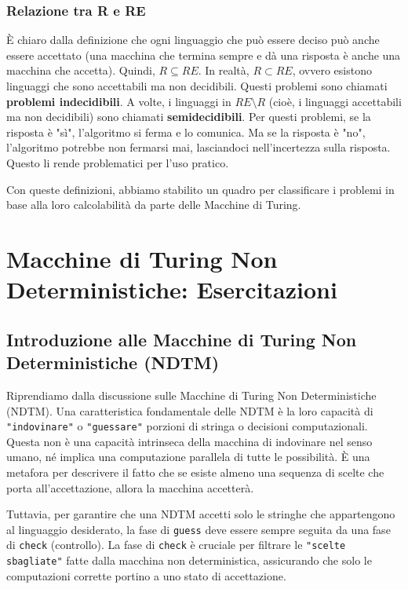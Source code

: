\documentclass[a4paper, 11pt]{book} %
\theoremstyle{definition}
\begin{document}
\subsection{Relazione tra R e RE}
È chiaro dalla definizione che ogni linguaggio che può essere deciso può anche essere accettato (una macchina che termina sempre e dà una risposta è anche una macchina che accetta). Quindi, $R \subseteq RE$.
In realtà, $R \subset RE$, ovvero esistono linguaggi che sono accettabili ma non decidibili. Questi problemi sono chiamati \textbf{problemi indecidibili}.
A volte, i linguaggi in $RE \setminus R$ (cioè, i linguaggi accettabili ma non decidibili) sono chiamati \textbf{semidecidibili}. Per questi problemi, se la risposta è "sì", l'algoritmo si ferma e lo comunica. Ma se la risposta è "no", l'algoritmo potrebbe non fermarsi mai, lasciandoci nell'incertezza sulla risposta. Questo li rende problematici per l'uso pratico.

Con queste definizioni, abbiamo stabilito un quadro per classificare i problemi in base alla loro calcolabilità da parte delle Macchine di Turing.



\chapter{Macchine di Turing Non Deterministiche: Esercitazioni}



\section{Introduzione alle Macchine di Turing Non Deterministiche (NDTM)}

Riprendiamo dalla discussione sulle Macchine di Turing Non Deterministiche (NDTM).
Una caratteristica fondamentale delle NDTM è la loro capacità di \texttt{"indovinare"} o \texttt{"guessare"} porzioni di stringa o decisioni computazionali. Questa non è una capacità intrinseca della macchina di indovinare nel senso umano, né implica una computazione parallela di tutte le possibilità. È una metafora per descrivere il fatto che se esiste almeno una sequenza di scelte che porta all'accettazione, allora la macchina accetterà.

Tuttavia, per garantire che una NDTM accetti solo le stringhe che appartengono al linguaggio desiderato, la fase di \texttt{guess} deve essere sempre seguita da una fase di \texttt{check} (controllo). La fase di \texttt{check} è cruciale per filtrare le \texttt{"scelte sbagliate"} fatte dalla macchina non deterministica, assicurando che solo le computazioni corrette portino a uno stato di accettazione.
\end{document}
